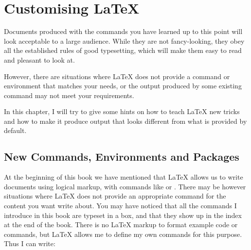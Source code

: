 %
%
%
%

\chapter{Customising \LaTeX}\label{chap:custom}

\begin{intro}
  Documents produced with the commands you have learned up to this
  point will look acceptable to a large audience. While they are not
  fancy-looking, they obey all the established rules of good
  typesetting, which will make them easy to read and pleasant to look at.

  However, there are situations where \LaTeX{} does not provide a
  command or environment that matches your needs, or the output
  produced by some existing command may not meet your requirements.

  In this chapter, I will try to give some hints on
  how to teach \LaTeX{} new tricks and how to make it produce output
  that looks different from what is provided by default.
\end{intro}

\section{New Commands, Environments and Packages}

At the beginning of this book we have mentioned that \LaTeX{} allows us to
write documents using logical markup, with commands like  or . There
may be however situations where \LaTeX{} does not provide an appropriate command for the content you want write about.
You may have noticed that all the
commands I introduce in this book are typeset in a box, and that they show up
in the index at the end of the book. There is no \LaTeX{} markup to format example code or commands, but \LaTeX{} allows me to define my own commands for this purpose. Thus I
can write:

